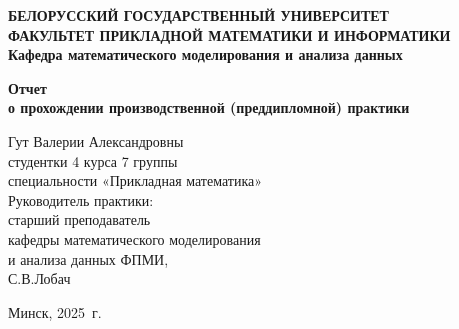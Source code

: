 \documentclass[a4paper, 14pt]{extreport}
\begin{document}
	\def\contentsname{ОГЛАВЛЕНИЕ}
	
	  \begin{titlepage}
		\begin{center}
			\textbf{БЕЛОРУССКИЙ ГОСУДАРСТВЕННЫЙ УНИВЕРСИТЕТ
				\\[5mm]
				{ФАКУЛЬТЕТ ПРИКЛАДНОЙ МАТЕМАТИКИ И ИНФОРМАТИКИ}\\[2mm]
				Кафедра математического моделирования и анализа данных
			}
			
			\vfill
			
			\textbf{Отчет
				\\[3mm]
				о прохождении производственной (преддипломной) практики
				\\[26mm]
			}
		\end{center}
		
		\hfill
		\begin{minipage}{.6\textwidth}
			\begin{flushright}
				Гут Валерии Александровны\\
				студентки 4 курса 7 группы\\
				специальности «Прикладная математика»\\[5mm]
				
				Руководитель практики:\\[2mm] 
				старший преподаватель\\
				кафедры математического моделирования\\
				и анализа данных ФПМИ,\\
				С.В.Лобач\\
				
				
			\end{flushright}
		\end{minipage}
		\vfill
		\begin{center}
			Минск, 2025\ г.
		\end{center}
	\end{titlepage}
	\newpage
	\setcounter{page}{2}
\end{document}
